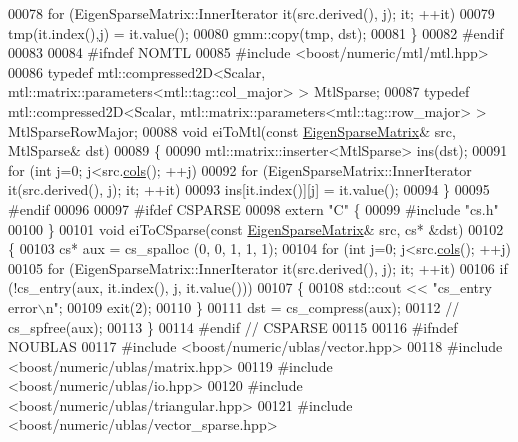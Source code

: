 \begin{DoxyCode}
00078     \textcolor{keywordflow}{for} (EigenSparseMatrix::InnerIterator it(src.derived(), j); it; ++it)
00079       tmp(it.index(),j) = it.value();
00080   gmm::copy(tmp, dst);
00081 \}
00082 \textcolor{preprocessor}{#endif}
00083 
00084 \textcolor{preprocessor}{#ifndef NOMTL}
00085 \textcolor{preprocessor}{#include <boost/numeric/mtl/mtl.hpp>}
00086 \textcolor{keyword}{typedef} mtl::compressed2D<Scalar, mtl::matrix::parameters<mtl::tag::col\_major> > MtlSparse;
00087 \textcolor{keyword}{typedef} mtl::compressed2D<Scalar, mtl::matrix::parameters<mtl::tag::row\_major> > MtlSparseRowMajor;
00088 \textcolor{keywordtype}{void} eiToMtl(\textcolor{keyword}{const} \hyperlink{group___sparse_core___module}{EigenSparseMatrix}& src, MtlSparse& dst)
00089 \{
00090   mtl::matrix::inserter<MtlSparse> ins(dst);
00091   \textcolor{keywordflow}{for} (\textcolor{keywordtype}{int} j=0; j<src.\hyperlink{group___sparse_core___module_aa391750e3c530227e4a5c3c52e959975}{cols}(); ++j)
00092     \textcolor{keywordflow}{for} (EigenSparseMatrix::InnerIterator it(src.derived(), j); it; ++it)
00093       ins[it.index()][j] = it.value();
00094 \}
00095 \textcolor{preprocessor}{#endif}
00096 
00097 \textcolor{preprocessor}{#ifdef CSPARSE}
00098 \textcolor{keyword}{extern} \textcolor{stringliteral}{"C"} \{
00099 \textcolor{preprocessor}{#include "cs.h"}
00100 \}
00101 \textcolor{keywordtype}{void} eiToCSparse(\textcolor{keyword}{const} \hyperlink{group___sparse_core___module}{EigenSparseMatrix}& src, cs* &dst)
00102 \{
00103   cs* aux = cs\_spalloc (0, 0, 1, 1, 1);
00104   \textcolor{keywordflow}{for} (\textcolor{keywordtype}{int} j=0; j<src.\hyperlink{group___sparse_core___module_aa391750e3c530227e4a5c3c52e959975}{cols}(); ++j)
00105     \textcolor{keywordflow}{for} (EigenSparseMatrix::InnerIterator it(src.derived(), j); it; ++it)
00106       \textcolor{keywordflow}{if} (!cs\_entry(aux, it.index(), j, it.value()))
00107       \{
00108         std::cout << \textcolor{stringliteral}{"cs\_entry error\(\backslash\)n"};
00109         exit(2);
00110       \}
00111    dst = cs\_compress(aux);
00112 \textcolor{comment}{//    cs\_spfree(aux);}
00113 \}
00114 \textcolor{preprocessor}{#endif // CSPARSE}
00115 
00116 \textcolor{preprocessor}{#ifndef NOUBLAS}
00117 \textcolor{preprocessor}{#include <boost/numeric/ublas/vector.hpp>}
00118 \textcolor{preprocessor}{#include <boost/numeric/ublas/matrix.hpp>}
00119 \textcolor{preprocessor}{#include <boost/numeric/ublas/io.hpp>}
00120 \textcolor{preprocessor}{#include <boost/numeric/ublas/triangular.hpp>}
00121 \textcolor{preprocessor}{#include <boost/numeric/ublas/vector\_sparse.hpp>}

\end{DoxyCode}

